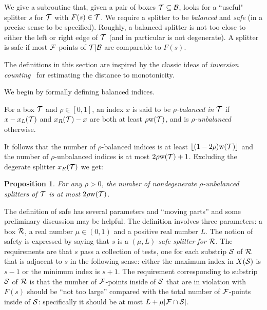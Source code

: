 \documentclass{acmsmall}
\newtheorem{prop}[theorem]{Proposition}
\newcommand{\cB}{{\cal B}}
\newcommand{\cF}{{\cal F}}
\newcommand{\cR}{{\cal R}}
\newcommand{\cS}{{\cal S}}
\newcommand{\cT}{{\cal T}}
\newcommand{\strip}[2]{#1|#2}
\newcommand{\width}{{\bf {\rm  w}}}
\begin{document}
We give a subroutine that, given a pair of boxes $\cT \subseteq \cB$,
looks for a ``useful" splitter $s$ for $\cT$ with $F(s) \in \cT$.
We require a splitter to be \emph{balanced} and \emph{safe} (in a precise sense to be specified).  Roughly,
a balanced splitter is not too close to either the  left or right edge of $\cT$ (and in particular is not degenerate).
A splitter is safe if most $\cF$-points of $ \strip{\cT}{\cB}$ are comparable to $F(s)$. 

The definitions in this section are inspired by the classic ideas of \emph{inversion counting}~\cite{EKK+00,ACCL1}
for estimating the distance to monotonicity.

We begin by formally defining balanced indices.

\begin{definition} \label{def:balanced} For a box $\cT$ and $\rho \in [0,1]$, an index $x$
is said to be {\em $\rho$-balanced in $\cT$}
if $x-x_L(\cT)$ and $x_R(\cT)-x$
are both at least  $\rho \width(\cT)$, and is \emph{$\rho$-unbalanced} otherwise.
\end{definition}
It follows that the number of $\rho$-balanced indices is at least $\lfloor (1-2\rho)\width(\cT) \rfloor$ and the number of $\rho$-unbalanced indices
is at most $2\rho \width(\cT) + 1$.  Excluding the degerate splitter $x_R(\cT)$ we get:
\begin{prop}
\label{prop:unbalanced} For any $\rho>0$,
the number of nondegenerate $\rho$-unbalanced splitters of $\cT$ is at most $2\rho \width(\cT)$.
\end{prop}


\medskip

The definition of safe has several parameters and ``moving parts'' and some preliminary discussion may be helpful.   The definition
involves three parameters: a box $\cR$, a real number $\mu \in (0,1)$ and a positive real number $L$.  
The notion of safety is expressed by saying that $s$ is a {\em $(\mu,L)$-safe splitter for $\cR$}.   The requirements are 
that $s$ pass a collection of tests, one for each substrip $\cS$ of $\cR$ that is
adjacent to $s$ in the following sense: either the maximum index in $X(\cS)$ is $s-1$ or the minimum index is $s+1$.
The requirement corresponding to substrip $\cS$ of $\cR$ is that the number 
of $\cF$-points inside of $\cS$ that are in violation with $F(s)$ should be ``not too large'' compared with the
total number of $\cF$-points inside of $\cS$: specifically it should be at most $L+\mu|\cF\cap \cS|$.
\end{document}
